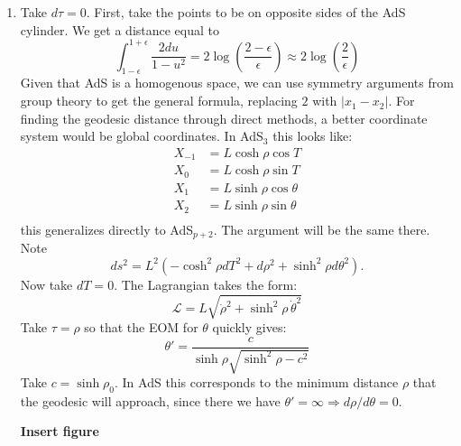 \documentclass[11pt, class=article, crop=false]{standalone}
\begin{document}
\begin{enumerate}
	\item Take $d\tau = 0$. First, take the points to be on opposite sides of the AdS cylinder. We get a distance equal to
	\[
		\int_{1-\epsilon}^{1+\epsilon} \frac{2 du}{1-u^2} = 2 \log\left(\frac{2-\epsilon}{\epsilon}\right) \approx 2 \log\left(\frac{2}{\epsilon}\right)
	\]
	Given that AdS is a homogenous space, we can use symmetry arguments from group theory to get the general formula, replacing $2$ with $|x_1 - x_2|$. For finding the geodesic distance through direct methods, a better coordinate system would be global coordinates. In AdS$_3$ this looks like:
	\[
	\begin{aligned}
		X_{-1} &= L \cosh \rho \cos T\\
		X_{0} &= L \cosh \rho \sin T\\
		X_{1} &= L \sinh \rho \cos \theta\\
		X_{2} &= L \sinh \rho \sin \theta\\
	\end{aligned}
	\] 
	this generalizes directly to AdS$_{p+2}$. The argument will be the same there. Note 
	\[
		ds^2 = L^2 (-\cosh^2 \rho dT^2 + d\rho^2 + \sinh^2 \rho d\theta^2).
	\]
	Now take $dT= 0$. The Lagrangian takes the form:
	\[
		\mathcal L = L \sqrt{\dot \rho^2 + \sinh^2 \rho \, \dot \theta^2}
	\]
	Take $\tau = \rho$ so that the EOM for $\theta$ quickly gives:
	\[
		\theta' = \frac{c}{\sinh \rho \sqrt{\sinh^2 \rho - c^2}}
	\]
	Take $c = \sinh \rho_0$. In AdS this corresponds to the minimum distance $\rho$ that the geodesic will approach, since there we have $\theta' = \infty \Rightarrow d\rho/d\theta = 0$.
	
	\textbf{Insert figure}
	

\end{enumerate}
\end{document}
